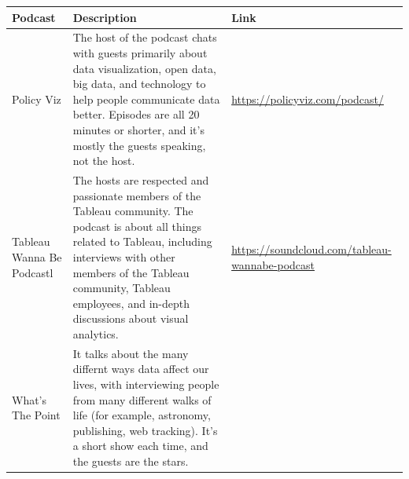\documentclass[]{book}
\begin{document}
\begin{longtable}[]{@{}lll@{}}
\toprule
\begin{minipage}[b]{0.11\columnwidth}\raggedright
\textbf{Podcast}\strut
\end{minipage} & \begin{minipage}[b]{0.68\columnwidth}\raggedright
\textbf{Description}\strut
\end{minipage} & \begin{minipage}[b]{0.11\columnwidth}\raggedright
\textbf{Link}\strut
\end{minipage}\tabularnewline
\midrule
\endhead
\begin{minipage}[t]{0.11\columnwidth}\raggedright
Policy Viz\strut
\end{minipage} & \begin{minipage}[t]{0.68\columnwidth}\raggedright
The host of the podcast chats with guests primarily about data visualization, open data, big data, and technology to help people communicate data better. Episodes are all 20 minutes or shorter, and it's mostly the guests speaking, not the host.\strut
\end{minipage} & \begin{minipage}[t]{0.11\columnwidth}\raggedright
\url{https://policyviz.com/podcast/}\strut
\end{minipage}\tabularnewline
\begin{minipage}[t]{0.11\columnwidth}\raggedright
Tableau Wanna Be Podcastl\strut
\end{minipage} & \begin{minipage}[t]{0.68\columnwidth}\raggedright
The hosts are respected and passionate members of the Tableau community. The podcast is about all things related to Tableau, including interviews with other members of the Tableau community, Tableau employees, and in-depth discussions about visual analytics.\strut
\end{minipage} & \begin{minipage}[t]{0.11\columnwidth}\raggedright
\url{https://soundcloud.com/tableau-wannabe-podcast}\strut
\end{minipage}\tabularnewline
\begin{minipage}[t]{0.11\columnwidth}\raggedright
What's The Point\strut
\end{minipage} & \begin{minipage}[t]{0.68\columnwidth}\raggedright
It talks about the many differnt ways data affect our lives, with interviewing people from many different walks of life (for example, astronomy, publishing, web tracking). It's a short show each time, and the guests are the stars.\strut

\end{minipage}
\end{longtable}
\end{document}
